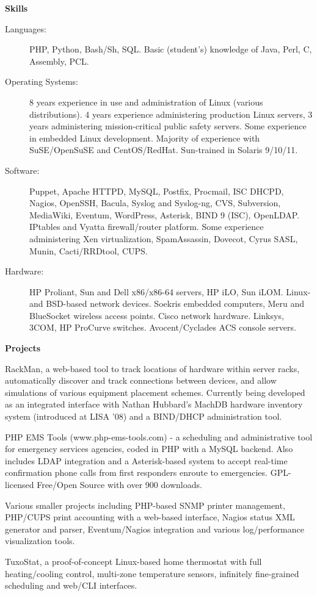 \documentclass[letterpaper,11pt]{article}
\newcommand{\resheading}[1]{{\large \colorbox{mygrey}{\begin{minipage}{\textwidth}{\textbf{#1 \vphantom{p\^{E}}}}\end{minipage}}}}
\begin{document}
\resheading{Skills}

\begin{description}
\item[Languages:]
PHP, Python, Bash/Sh, SQL. Basic (student's) knowledge of Java, Perl, C,
Assembly, PCL.
\item[Operating Systems:]
8 years experience in use and administration of Linux (various
distributions). 4 years experience administering production Linux servers, 3
years administering mission-critical public safety servers. Some experience in
embedded Linux development. Majority of experience with SuSE/OpenSuSE and
CentOS/RedHat.
Sun-trained in Solaris 9/10/11.
\item[Software:]
Puppet, Apache HTTPD, MySQL, Postfix, Procmail, ISC DHCPD, Nagios, OpenSSH,
Bacula,
Syslog and Syslog-ng, CVS, Subversion, MediaWiki, Eventum, WordPress,
Asterisk, BIND 9 (ISC), OpenLDAP. IPtables and Vyatta firewall/router
platform. Some experience administering Xen virtualization, SpamAssassin,
Dovecot, Cyrus SASL, Munin, Cacti/RRDtool,  CUPS.

\item[Hardware:]
HP Proliant, Sun and Dell x86/x86-64 servers, HP iLO, Sun iLOM. Linux- and
BSD-based network devices. Soekris embedded computers, Meru and BlueSocket
wireless access points. Cisco network hardware. Linksys, 3COM, HP ProCurve
switches. Avocent/Cyclades ACS console servers.
\end{description}

\resheading{Projects}

\begin{description}
\item[In Progress] RackMan, a web-based tool to track locations of hardware
  within server racks, automatically discover and track connections between
  devices, and allow simulations of various equipment placement
  schemes. Currently being developed as an integrated interface with Nathan
  Hubbard's MachDB hardware inventory system (introduced at LISA '08) and a
  BIND/DHCP administration tool.
\item[2007--Present] PHP EMS Tools (www.php-ems-tools.com) - a scheduling and
  administrative tool for emergency services agencies, coded in PHP with a MySQL
  backend. Also includes LDAP integration and a Asterisk-based system to accept
  real-time confirmation phone calls from first responders enroute to
  emergencies. GPL-licensed Free/Open Source with over 900 downloads.
\item Various smaller projects including PHP-based SNMP printer management,
  PHP/CUPS print accounting with a web-based interface, Nagios status XML
  generator and parser, Eventum/Nagios integration and various log/performance
  visualization tools.
\item TuxoStat, a proof-of-concept Linux-based home thermostat with full
  heating/cooling control, multi-zone temperature sensors, infinitely
  fine-grained scheduling and web/CLI interfaces.
\end{description}
\end{document}
